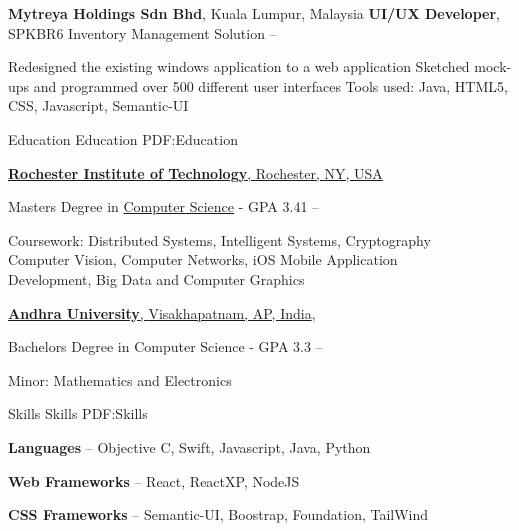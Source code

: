 \documentclass[letterpaper,MMMyyyy,nonstopmode]{simpleresumecv}
\begin{document}
\begin{Body}
\BigGap
\BigGap

\Entry
{\textbf{Mytreya Holdings Sdn Bhd}, \small{Kuala Lumpur, Malaysia}}
\Gap
\BulletItem
\textbf{UI/UX Developer}, SPKBR6 Inventory Management Solution
\hfill
{} --
\begin{Detail}
\SubBulletItem
Redesigned the existing windows application to a web application
\SubBulletItem
Sketched mock-ups and programmed over 500 different user interfaces
\SubBulletItem
Tools used: Java, HTML5, CSS, Javascript, Semantic-UI
\end{Detail}

\BigGap

\Section
{Education}
{Education}
{PDF:Education}

\Entry
\href{https://www.rit.edu}
{\textbf{Rochester Institute of Technology}, \small{Rochester, NY, USA}}

\Gap
\BulletItem
Masters Degree in
\href{https://cs.rit.edu}
{Computer Science} - GPA 3.41
\hfill
{} --
\begin{Detail}
\SubBulletItem
Coursework:
Distributed Systems, Intelligent Systems, Cryptography\\Computer Vision, Computer Networks, iOS Mobile Application \\Development, Big Data and Computer Graphics
\end{Detail}


\BigGap
\BigGap

\Entry
\href{http://www.andhrauniversity.edu.in}
{\textbf{Andhra University}, \small{Visakhapatnam, AP, India}},

\Gap
\BulletItem
Bachelors Degree in Computer Science - GPA 3.3
\hfill
{} --
\begin{Detail}
\SubBulletItem
Minor:
Mathematics and Electronics
\end{Detail}



\Section
{Skills}
{Skills}
{PDF:Skills}

\BulletItem
\textbf{Languages} -- Objective C, Swift, Javascript, Java, Python
\Gap

\BulletItem
\textbf{Web Frameworks} -- React, ReactXP, NodeJS
\Gap

\BulletItem
\textbf{CSS Frameworks} -- Semantic-UI, Boostrap, Foundation, TailWind
\Gap


\end{Body}
\end{document}
